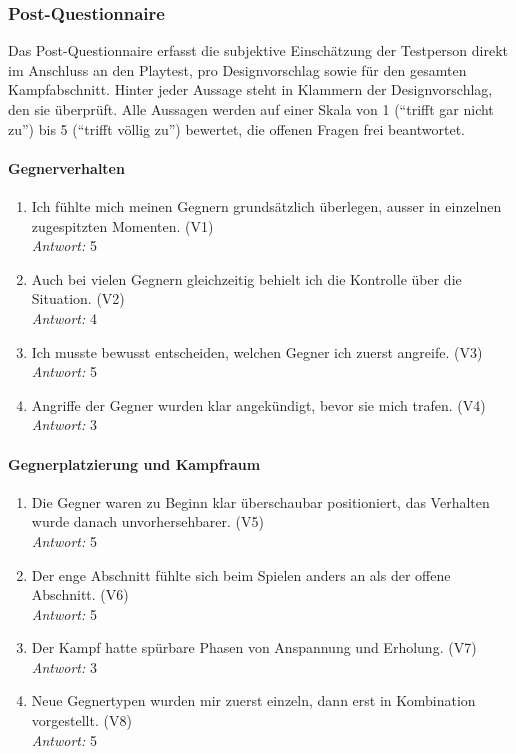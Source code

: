 \documentclass[../Main.tex]{subfiles}
\begin{document}
\subsubsection{Post-Questionnaire}

Das Post-Questionnaire erfasst die subjektive Einschätzung der Testperson direkt im Anschluss an den Playtest, pro Designvorschlag sowie für den gesamten Kampfabschnitt. Hinter jeder Aussage steht in Klammern der Designvorschlag, den sie überprüft. Alle Aussagen werden auf einer Skala von 1 (\enquote{trifft gar nicht zu}) bis 5 (\enquote{trifft völlig zu}) bewertet, die offenen Fragen frei beantwortet.

\paragraph{Gegnerverhalten}
\begin{enumerate}[label=\textbf{Q\arabic*}, leftmargin=1.5cm, itemsep=0.8em]
    \item Ich fühlte mich meinen Gegnern grundsätzlich überlegen, ausser in einzelnen zugespitzten Momenten. \hfill (V1) \\
        \textit{Antwort:} 5
    \item Auch bei vielen Gegnern gleichzeitig behielt ich die Kontrolle über die Situation. \hfill (V2) \\
        \textit{Antwort:} 4
    \item Ich musste bewusst entscheiden, welchen Gegner ich zuerst angreife. \hfill (V3) \\
        \textit{Antwort:} 5
    \item Angriffe der Gegner wurden klar angekündigt, bevor sie mich trafen. \hfill (V4) \\
        \textit{Antwort:} 3
\end{enumerate}

\paragraph{Gegnerplatzierung und Kampfraum}
\begin{enumerate}[label=\textbf{Q\arabic*}, leftmargin=1.5cm, itemsep=0.8em, resume]
    \item Die Gegner waren zu Beginn klar überschaubar positioniert, das Verhalten wurde danach unvorhersehbarer. \hfill (V5) \\
        \textit{Antwort:} 5
    \item Der enge Abschnitt fühlte sich beim Spielen anders an als der offene Abschnitt. \hfill (V6) \\
        \textit{Antwort:} 5
    \item Der Kampf hatte spürbare Phasen von Anspannung und Erholung. \hfill (V7) \\
        \textit{Antwort:} 3
    \item Neue Gegnertypen wurden mir zuerst einzeln, dann erst in Kombination vorgestellt. \hfill (V8) \\
        \textit{Antwort:} 5
\end{enumerate}
\end{document}
